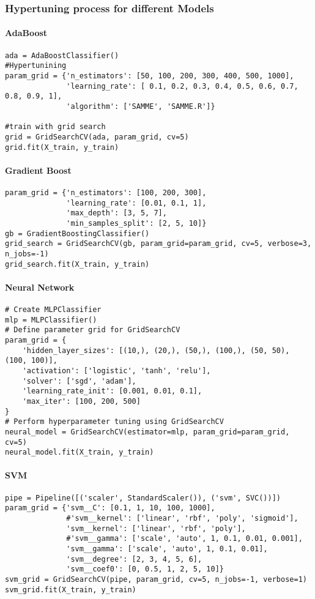 \documentclass{article}
\begin{document}
\subsubsection{Hypertuning process for different Models}
\paragraph{AdaBoost}
\begin{verbatim}
ada = AdaBoostClassifier()
#Hypertunining
param_grid = {'n_estimators': [50, 100, 200, 300, 400, 500, 1000],
              'learning_rate': [ 0.1, 0.2, 0.3, 0.4, 0.5, 0.6, 0.7, 0.8, 0.9, 1],
              'algorithm': ['SAMME', 'SAMME.R']}

#train with grid search
grid = GridSearchCV(ada, param_grid, cv=5)
grid.fit(X_train, y_train)
\end{verbatim}
\paragraph{Gradient Boost}
\begin{verbatim}
param_grid = {'n_estimators': [100, 200, 300],
              'learning_rate': [0.01, 0.1, 1],
              'max_depth': [3, 5, 7],
              'min_samples_split': [2, 5, 10]}
gb = GradientBoostingClassifier()
grid_search = GridSearchCV(gb, param_grid=param_grid, cv=5, verbose=3, n_jobs=-1)
grid_search.fit(X_train, y_train)
\end{verbatim}
\paragraph{Neural Network}
\begin{verbatim}
# Create MLPClassifier
mlp = MLPClassifier()
# Define parameter grid for GridSearchCV
param_grid = {
    'hidden_layer_sizes': [(10,), (20,), (50,), (100,), (50, 50), (100, 100)],
    'activation': ['logistic', 'tanh', 'relu'],
    'solver': ['sgd', 'adam'],
    'learning_rate_init': [0.001, 0.01, 0.1],
    'max_iter': [100, 200, 500]
}
# Perform hyperparameter tuning using GridSearchCV
neural_model = GridSearchCV(estimator=mlp, param_grid=param_grid, cv=5)
neural_model.fit(X_train, y_train)
\end{verbatim}

\paragraph{SVM}
\begin{verbatim}
pipe = Pipeline([('scaler', StandardScaler()), ('svm', SVC())])
param_grid = {'svm__C': [0.1, 1, 10, 100, 1000], 
              #'svm__kernel': ['linear', 'rbf', 'poly', 'sigmoid'], 
              'svm__kernel': ['linear', 'rbf', 'poly'], 
              #'svm__gamma': ['scale', 'auto', 1, 0.1, 0.01, 0.001],
              'svm__gamma': ['scale', 'auto', 1, 0.1, 0.01], 
              'svm__degree': [2, 3, 4, 5, 6],
              'svm__coef0': [0, 0.5, 1, 2, 5, 10]}
svm_grid = GridSearchCV(pipe, param_grid, cv=5, n_jobs=-1, verbose=1)
svm_grid.fit(X_train, y_train)
\end{verbatim}
\end{document}
